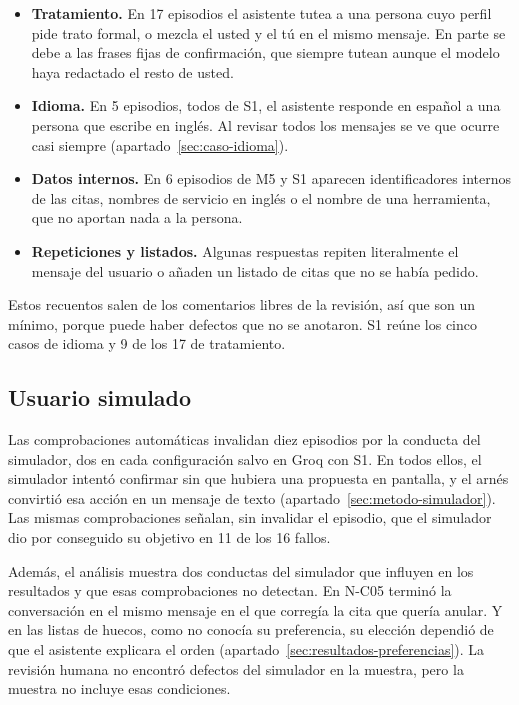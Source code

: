 \begin{itemize}
  \item \textbf{Tratamiento.} En 17 episodios el asistente tutea a una persona
  cuyo perfil pide trato formal, o mezcla el usted y el tú en el mismo
  mensaje. En parte se debe a las frases fijas de confirmación, que siempre
  tutean aunque el modelo haya redactado el resto de usted.
  \item \textbf{Idioma.} En 5 episodios, todos de S1, el asistente responde en
  español a una persona que escribe en inglés. Al revisar todos los
  mensajes se ve que ocurre casi siempre (apartado~\ref{sec:caso-idioma}).
  \item \textbf{Datos internos.} En 6 episodios de M5 y S1 aparecen
  identificadores internos de las citas, nombres de servicio en inglés o el
  nombre de una herramienta, que no aportan nada a la persona.
  \item \textbf{Repeticiones y listados.} Algunas respuestas repiten
  literalmente el mensaje del usuario o añaden un listado de citas que no se
  había pedido.
\end{itemize}

Estos recuentos salen de los comentarios libres de la revisión, así que son
un mínimo, porque puede haber defectos que no se anotaron. S1 reúne los cinco casos de idioma y 9 de los 17 de tratamiento.

\subsection{Usuario simulado}
\label{sec:resultados-simulador}

Las comprobaciones automáticas invalidan diez episodios por la conducta del
simulador, dos en cada configuración salvo en Groq con S1. En todos ellos, el
simulador intentó confirmar sin que hubiera una propuesta en pantalla, y el
arnés convirtió esa acción en un mensaje de texto
(apartado~\ref{sec:metodo-simulador}). Las mismas comprobaciones señalan, sin
invalidar el episodio, que el simulador dio por conseguido su objetivo en 11 de
los 16 fallos.

Además, el análisis muestra dos conductas del simulador que influyen en los
resultados y que esas comprobaciones no detectan. En N-C05 terminó la
conversación en el mismo mensaje en el que corregía la cita que quería anular.
Y en las listas de huecos, como no conocía su preferencia, su elección dependió
de que el asistente explicara el orden
(apartado~\ref{sec:resultados-preferencias}). La revisión humana no encontró
defectos del simulador en la muestra, pero la muestra no incluye esas
condiciones.

